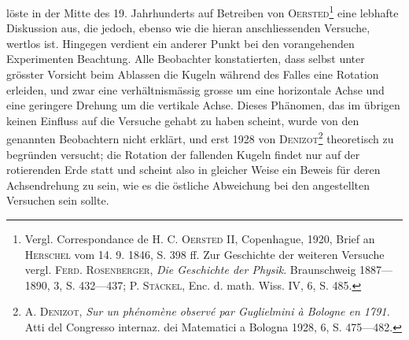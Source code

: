 löste in der Mitte des 19. Jahrhunderts auf Betreiben von \textsc{Oersted}\footnote{Vergl. Correspondance de H. C. \textsc{Oersted} II, Copenhague, 1920, Brief an \textsc{Herschel} vom 14. 9.
1846, S. 398 ff. Zur Geschichte der weiteren Versuche vergl. \textsc{Ferd. Rosenberger}, \textit{Die Geschichte der
Physik}. Braunschweig 1887—1890, 3, S. 432—437; P. \textsc{Stäckel}, Enc. d. math. Wiss. IV, 6, S. 485.}
eine lebhafte Diskussion aus, die jedoch, ebenso wie die hieran anschliessenden
Versuche, wertlos ist. Hingegen verdient ein anderer Punkt bei
den vorangehenden Experimenten Beachtung. Alle Beobachter konstatierten,
dass selbst unter grösster Vorsicht beim Ablassen die Kugeln während des Falles
eine Rotation erleiden, und zwar eine verhältnismässig grosse um eine horizontale
Achse und eine geringere Drehung um die vertikale Achse. Dieses
Phänomen, das im übrigen keinen Einfluss auf die Versuche gehabt zu haben
scheint, wurde von den genannten Beobachtern nicht erklärt, und erst 1928
von \textsc{Denizot}\footnote{A. \textsc{Denizot}, \textit{Sur un phénomène observé par Guglielmini à Bologne en 1791.} Atti del Congresso
internaz. dei Matematici a Bologna 1928, 6, S. 475—482.} theoretisch zu begründen versucht; die Rotation der fallenden
Kugeln findet nur auf der rotierenden Erde statt und scheint also in gleicher
Weise ein Beweis für deren Achsendrehung zu sein, wie es die östliche Abweichung
bei den angestellten Versuchen sein sollte.
\clearpage\endgroup
